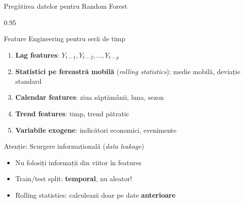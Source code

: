 \documentclass[9pt, aspectratio=169, t]{beamer}
\begin{document}
\begin{frame}{Pregătirea datelor pentru Random Forest}
    \begin{cminipage}{0.95\textwidth}
        \begin{block}{Feature Engineering pentru serii de timp}
            \begin{enumerate}\setlength{\itemsep}{0pt}
                \item \textbf{Lag features}: $Y_{t-1}, Y_{t-2}, \ldots, Y_{t-p}$
                \item \textbf{Statistici pe fereastră mobilă} (\emph{rolling statistics}): medie mobilă, deviație standard
                \item \textbf{Calendar features}: ziua săptămânii, luna, sezon
                \item \textbf{Trend features}: timp, trend pătratic
                \item \textbf{Variabile exogene}: indicători economici, evenimente
            \end{enumerate}
        \end{block}

        \vspace{0.2cm}

        \begin{alertblock}{Atenție: Scurgere informațională (\emph{data leakage})}
            \begin{itemize}\setlength{\itemsep}{0pt}
                \item Nu folosiți informații din viitor în features
                \item Train/test split: \textbf{temporal}, nu aleator!
                \item Rolling statistics: calculează doar pe date \textbf{anterioare}
            \end{itemize}
        \end{alertblock}
    \end{cminipage}
\end{frame}
\end{document}
